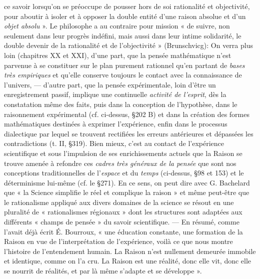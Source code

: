 ce savoir lorsqu'on se préoccupe de pousser hors de soi rationalité et
objectivité, pour aboutir à isoler et à opposer la double entité d’une
raison absolue et d’un {\it objet absolu} ». Le philosophe a au contraire
pour mission « de suivre, non seulement dans leur progrès indéfini,
mais aussi dans leur intime solidarité, le double devenir de la rationalité et de l’objectivité » (Brunschvicg): On verra plus loin (chapitres XX et XXI), d’une part, que la pensée mathématique n’est
parvenue à se constituer sur le plan purement rationnel qu’en
partant de {\it bases très empiriques} et qu’elle conserve toujours le contact
avec la connaissance de l’univers, — d’autre part, que la pensée expérimentale, loin d’être un enregistrement passif, implique une continuelle {\it activité de l'esprit}, dès la constatation même des faits, puis dans
la conception de l'hypothèse, dans le raisonnement expérimental
(cf. ci-dessus, \S 202 B) et dans la création des formes mathématiques
destinées à exprimer l’expérience, enfin dans le processus dialectique
par lequel se trouvent rectifiées les erreurs antérieures et dépassées
les contradictions (t. II, \S 319). Bien mieux, c’est au contact de l’expérience scientifique et sous l'impulsion de ses enrichissements actuels
que la Raison se trouve amenée à refondre ces {\it cadres très généraux
de la pensée} que sont nos conceptions traditionnelles de l’{\it espace} et
du {\it temps} (ci-dessus, \S 98 et 153) et le déterminisme lui-même (cf. le
\S 271). En ce sens, on peut dire avec G. Bachelard que « la Science
simplifie le réel et complique la raison » et même peut-être que le
rationalisme appliqué aux divers domaines de la science se résout en
une pluralité de « rationalismes régionaux » dont les structures sont
adaptées aux différents « champs de pensée » du savoir scientifique. —
En résumé, comme l’avait déjà écrit É. Bourroux, « une éducation
constante, une formation de la Raison en vue de l'interprétation de
l'expérience, voilà ce que nous montre l’histoire de l’entendement
humain. La Raison n’est nullement demeurée immobile et identique,
comme on l’a cru. La Raison est une réalité, donc elle vit, donc elle
se nourrit de réalités, et par là même s'adapte et se développe ».
